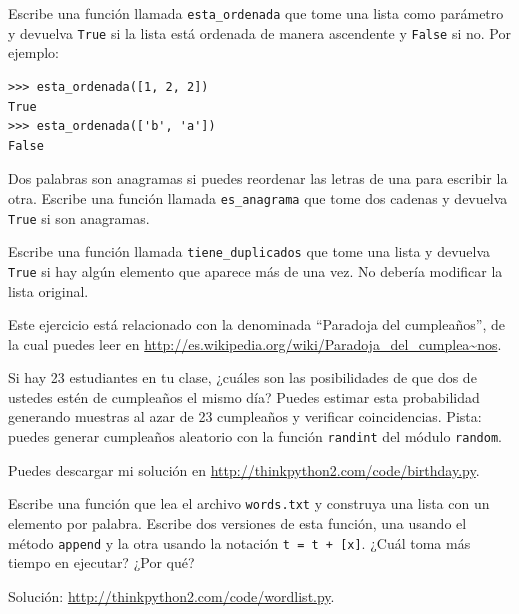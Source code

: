 \documentclass[10pt]{book}
\begin{document}
\begin{exercise}
Escribe una función llamada \verb"esta_ordenada" que tome una lista como
parámetro y devuelva {\tt True} si la lista está ordenada de manera
ascendente y {\tt False} si no.  Por ejemplo:

\begin{verbatim}
>>> esta_ordenada([1, 2, 2])
True
>>> esta_ordenada(['b', 'a'])
False
\end{verbatim}

\end{exercise}


\begin{exercise}
\label{anagram}

Dos palabras son anagramas si puedes reordenar las letras de una
para escribir la otra.  Escribe una función llamada \verb"es_anagrama"
que tome dos cadenas y devuelva {\tt True} si son anagramas.
\end{exercise}



\begin{exercise}
\label{duplicate}

Escribe una función llamada \verb"tiene_duplicados" que tome
una lista y devuelva {\tt True} si hay algún elemento que
aparece más de una vez.  No debería modificar la lista
original.

\end{exercise}


\begin{exercise}

Este ejercicio está relacionado con la denominada ``Paradoja del cumpleaños'', de la cual
puedes leer en \url{http://es.wikipedia.org/wiki/Paradoja_del_cumplea\~nos}.

Si hay 23 estudiantes en tu clase, ¿cuáles son las posibilidades
de que dos de ustedes estén de cumpleaños el mismo día?  Puedes estimar esta
probabilidad generando muestras al azar de 23 cumpleaños
y verificar coincidencias.  Pista: puedes generar cumpleaños aleatorio
con la función {\tt randint} del módulo {\tt random}.

Puedes descargar mi
solución en \url{http://thinkpython2.com/code/birthday.py}.

\end{exercise}



\begin{exercise}

Escribe una función que lea el archivo {\tt words.txt} y construya
una lista con un elemento por palabra.  Escribe dos versiones de
esta función, una usando el método {\tt append} y la
otra usando la notación {\tt t = t + [x]}.  ¿Cuál toma más
tiempo en ejecutar?  ¿Por qué?

Solución: \url{http://thinkpython2.com/code/wordlist.py}.

\end{exercise}
\end{document}
